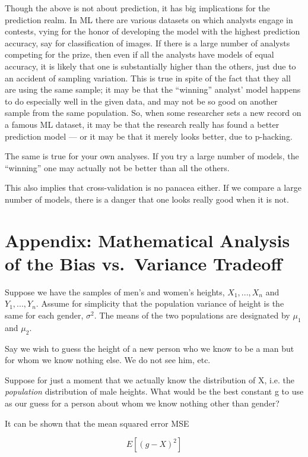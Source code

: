 Though the above is not about prediction, it has big implications for
the prediction realm.  In ML there are various datasets on which
analysts engage in contests, vying for the honor of developing the model
with the highest prediction accuracy, say for classification of images.
If there is a large number of analysts competing for the prize, then
even if all the analysts have models of equal accuracy, it is likely
that one is substantially higher than the others, just due to an
accident of sampling variation.  This is true in spite of the fact that
they all are using the same sample; it may be that the ``winning''
analyst' model happens to do especially well in the given data, and may
not be so good on another sample from the same population.  So, when some
researcher sets a new record on a famous ML dataset, it may be that the
research really has found a better prediction model --- or it may be
that it merely looks better, due to p-hacking.

The same is true for your own analyses.  If you try a large number of
models, the ``winning'' one may actually not be better than all the
others.

This also implies that cross-validation is no panacea either.  If we
compare a large number of models, there is a danger that one looks
really good when it is not.

\section{Appendix:  Mathematical Analysis of the Bias vs.\ Variance
Tradeoff}

Suppose we have the samples of men's and women's heights, $X_1,...,X_n$
and $Y_1,...,Y_n$.  Assume for simplicity that the population variance
of height is the same for each gender, $\sigma^2$.  The means of the two
populations are designated by $\mu_1$ and $\mu_2$.

Say we wish to guess the height of a new person who we know to be a man
but for whom we know nothing else.  We do not see him, etc.

Suppose for just a moment that we actually know the distribution of X,
i.e. the {\it population} distribution of male heights.  What would be
the best constant g to use as our guess for a person about whom we know
nothing other than gender?

It can be shown that the mean squared error MSE 

\begin{equation}
E[(g-X)^2]
\end{equation}

